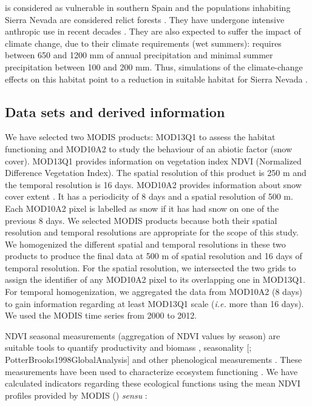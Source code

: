 \Qpy is considered as vulnerable in southern Spain \autocite{Viveroetal2000QuercusPyrenaica} and the populations inhabiting Sierra Nevada are considered relict forests \autocite{MelendoValle2000EstudioComparativo}. They have undergone intensive anthropic use in recent decades \autocite{CamachoOlmedoetal2002AltaAlpujarra}. They are also expected to suffer the impact of climate change, due to their climate requirements (wet summers): \Qpy requires between 650 and 1200 mm of annual precipitation and minimal summer precipitation between 100 and 200 mm. Thus, simulations of the climate-change effects on this habitat point to a reduction in suitable habitat for Sierra Nevada \autocite{Benito2009EcoinformaticaAplicada,Benitoetal2011SimulatingPotential}.

\subsection{Data sets and derived information}\label{sec:onto:Data}

We have selected two MODIS products: MOD13Q1 to assess the habitat functioning and MOD10A2 to study the behaviour of an abiotic factor (snow cover). MOD13Q1 provides information on vegetation index NDVI (Normalized Difference Vegetation Index). The spatial resolution of this product is 250 m and the temporal resolution is 16 days. MOD10A2 provides information about snow cover extent \autocite{Halletal2002MODISSnowcover}. It has a periodicity of 8 days and a spatial resolution of 500 m. Each MOD10A2 pixel is labelled as snow if it has had snow on one of the previous 8 days. We selected MODIS products because both their spatial resolution and temporal resolutions are appropriate for the scope of this study.
We homogenized the different spatial and temporal resolutions in these two products to produce the final data at 500 m of spatial resolution and 16 days of temporal resolution. For the spatial resolution, we intersected the two grids to assign the identifier of any MOD10A2 pixel to its overlapping one in MOD13Q1. For temporal homogenization, we aggregated the data from MOD10A2 (8 days) to gain information regarding at least MOD13Q1 scale (\emph{i.e.} more than 16 days). We used the MODIS time series from 2000 to 2012.

NDVI seasonal measurements (aggregation of NDVI values by season) are suitable tools to quantify productivity and biomass \autocite{Runningetal2004ContinuousSatelliteDerived,Turneretal2006EvaluationMODIS}, seasonality {[}\textcite{Pineiroetal2006SeasonalVariation}; PotterBrooks1998GlobalAnalysis{]} and other phenological measurements \autocite{Clelandetal2007ShiftingPlant}. These measurements have been used to characterize ecosystem functioning \autocite{Cabelloetal2012EcosystemFunctioning}. We have calculated indicators regarding these ecological functions using the mean NDVI profiles provided by MODIS () \emph{sensu} \textcite{AlcarazSeguraetal2009BaselineCharacterization}:

